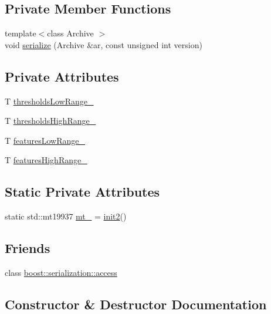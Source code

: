 \subsection*{Private Member Functions}
\begin{DoxyCompactItemize}
\item 
{\footnotesize template$<$class Archive $>$ }\\void \hyperlink{classMatrixBPCFeatures_ac1c62b0776f9a2f22f69b7debf86ecce}{serialize} (Archive \&ar, const unsigned int version)
\end{DoxyCompactItemize}
\subsection*{Private Attributes}
\begin{DoxyCompactItemize}
\item 
T \hyperlink{classMatrixBPCFeatures_a3b26efde265078abd546a45ea443bf6d}{thresholds\+Low\+Range\+\_\+}
\item 
T \hyperlink{classMatrixBPCFeatures_ae8a6cffe3353dfd370fb0b4e5d2385ca}{thresholds\+High\+Range\+\_\+}
\item 
T \hyperlink{classMatrixBPCFeatures_a973ec0283a77495339d330c482e73782}{features\+Low\+Range\+\_\+}
\item 
T \hyperlink{classMatrixBPCFeatures_a35acee240ac781db0390c068c782437d}{features\+High\+Range\+\_\+}
\end{DoxyCompactItemize}
\subsection*{Static Private Attributes}
\begin{DoxyCompactItemize}
\item 
static std\+::mt19937 \hyperlink{classMatrixBPCFeatures_aaf2ce60f69f7d3bbb85c4f4bc8b66383}{mt\+\_\+} = \hyperlink{MatrixBPCFeatures_8cpp_acd8f02610f7d92f49cfc5c5e0ad4c0da}{init2}()
\end{DoxyCompactItemize}
\subsection*{Friends}
\begin{DoxyCompactItemize}
\item 
class \hyperlink{classMatrixBPCFeatures_ac98d07dd8f7b70e16ccb9a01abf56b9c}{boost\+::serialization\+::access}
\end{DoxyCompactItemize}


\subsection{Constructor \& Destructor Documentation}

